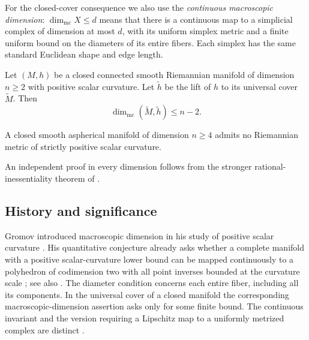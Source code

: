 For the closed-cover consequence we also use the \emph{continuous
macroscopic dimension}: $\dim_{\mathrm{mc}}X\le d$ means that there is a
continuous map to a simplicial complex of dimension at most $d$, with its uniform simplex metric
and a finite uniform bound on the diameters of its entire fibers.
Each simplex has the same standard Euclidean shape and edge length.

\begin{corollary}
\label{cover:main}
Let $(M,h)$ be a closed connected smooth Riemannian manifold of
dimension $n\ge2$ with positive scalar curvature.  Let $\widetilde h$ be the lift of $h$ to its universal cover
$\widetilde M$. Then
\[
 \dim_{\mathrm{mc}}(\widetilde M,\widetilde h)\le n-2.
\]
\end{corollary}

\begin{corollary}\label{cor:aspherical}
A closed smooth aspherical manifold of dimension \(n\ge4\) admits
no Riemannian metric of strictly positive scalar curvature.
\end{corollary}



An independent proof in every dimension follows from the stronger
rational-inessentiality theorem of
\citet[Theorem~1.1 and Corollary~1.2]{openai2026RationalInessentiality}.

\subsection{History and significance}

Gromov introduced macroscopic dimension in his study of positive scalar
curvature \citep[\S2]{gromov1996}. His quantitative conjecture already asks
whether a complete manifold with a positive scalar-curvature lower bound
can be mapped continuously to a polyhedron of codimension two with all
point inverses bounded at the curvature scale
\citep[\S\(2\frac12\)]{gromov1996}; see also
\citep[p.~3180, Comments after Conjecture~3.2]{gromov2019Mean}.
The diameter condition concerns each entire fiber, including all its
components. In the universal cover of a closed manifold the corresponding
macroscopic-dimension assertion asks only for some finite bound.
The continuous invariant and the version requiring a Lipschitz map to a
uniformly metrized complex are distinct
\citep[Definitions~1.1--1.2, Theorem~6.3 and the following Example]{dranishnikov2014}.

